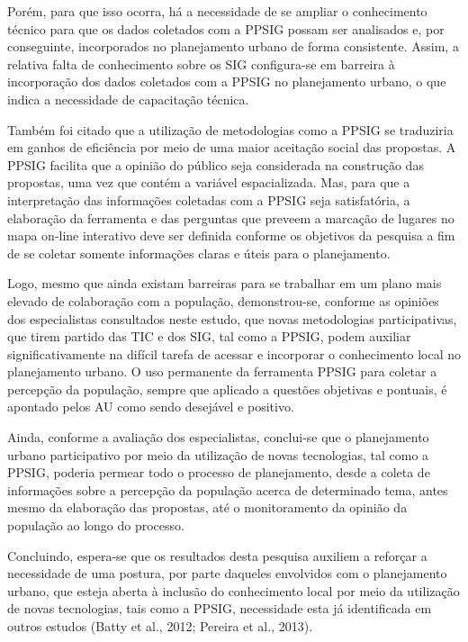 \documentclass{article}
\begin{document}
\begin{multicols}{2}
Porém, para que isso ocorra, há a necessidade de se ampliar o conhecimento
técnico
para que os dados coletados com a PPSIG possam ser analisados e, por
conseguinte,
incorporados no planejamento urbano de forma consistente. Assim, a relativa
falta de
conhecimento sobre os SIG configura-se em barreira à incorporação dos dados
coletados com a PPSIG no planejamento urbano, o que indica a necessidade de
capacitação técnica.

Também foi citado que a utilização de metodologias como a PPSIG se traduziria em
ganhos de eficiência por meio de uma maior aceitação social das propostas. A
PPSIG
facilita que a opinião do público seja considerada na construção das propostas,
uma
vez que contém a variável espacializada. Mas, para que a interpretação das
informações coletadas com a PPSIG seja satisfatória, a elaboração da ferramenta
e
das perguntas que preveem a marcação de lugares no mapa on-line interativo deve
ser
definida conforme os objetivos da pesquisa a fim de se coletar somente
informações
claras e úteis para o planejamento.

Logo, mesmo que ainda existam barreiras para se trabalhar em um plano mais
elevado de
colaboração com a população, demonstrou-se, conforme as opiniões dos
especialistas
consultados neste estudo, que novas metodologias participativas, que tirem
partido
das TIC e dos SIG, tal como a PPSIG, podem auxiliar significativamente na
difícil
tarefa de acessar e incorporar o conhecimento local no planejamento urbano. O
uso
permanente da ferramenta PPSIG para coletar a percepção da população, sempre que
aplicado a questões objetivas e pontuais, é apontado pelos AU como sendo
desejável e
positivo.

Ainda, conforme a avaliação dos especialistas, conclui-se que o planejamento
urbano
participativo por meio da utilização de novas tecnologias, tal como a PPSIG,
poderia
permear todo o processo de planejamento, desde a coleta de informações sobre a
percepção da população acerca de determinado tema, antes mesmo da elaboração das
propostas, até o monitoramento da opinião da população ao longo do processo.

Concluindo, espera-se que os resultados desta pesquisa auxiliem a reforçar a
necessidade de uma postura, por parte daqueles envolvidos com o planejamento
urbano,
que esteja aberta à inclusão do conhecimento local por meio da utilização de
novas
tecnologias, tais como a PPSIG, necessidade esta já identificada em outros
estudos
(Batty et al., 2012; Pereira et al., 2013).

\end{multicols}
\end{document}
